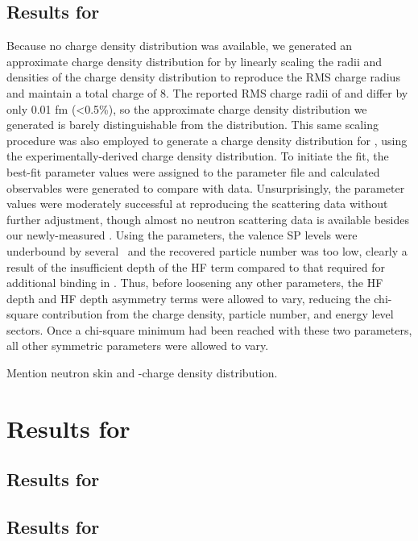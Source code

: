 \subsection{Results for \oEight}
Because no \oEight charge density distribution was available, we generated an approximate charge density
distribution for \oEight by linearly scaling
the radii and densities of the \oSix charge density distribution to reproduce the \oEight RMS charge
radius and maintain a total charge of 8. The reported RMS charge radii of \oSix and \oEight differ by only
0.01 fm (<0.5\%), so the approximate \oEight charge density distribution we generated is barely
distinguishable from the \oSix distribution. This same scaling procedure was also employed to
generate a charge density distribution for \snTwelve, using the
experimentally-derived \snFour charge density distribution. To initiate the fit, the \oSix best-fit parameter values
were assigned to the \oEight parameter file and calculated observables were generated to compare
with \oEight data. Unsurprisingly, the \oSix parameter values were moderately successful at reproducing
the \oEight scattering data without further adjustment, though almost no neutron scattering data is
available besides our newly-measured \tot. Using the \oSix parameters, the \oEight valence SP levels were underbound
by several \mega\electronvolt\ and the recovered particle number was too low, clearly a result of the insufficient
depth of the \oSix HF term compared to that required for additional binding in \oEight. Thus, before
loosening any other parameters, the HF depth and HF depth asymmetry terms were allowed to vary,
reducing the chi-square contribution from the charge density, particle number, and energy level
sectors. Once a chi-square minimum had been reached with these two parameters, all other symmetric parameters
were allowed to vary.

Mention neutron skin and \neEight-\oEight charge density distribution.

\section{Results for \niEightFour}

\subsection{Results for \niEight}
\subsection{Results for \niFour}

